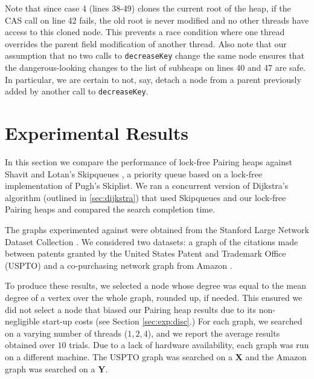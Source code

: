 \documentclass{acm_proc_article-sp}
\begin{document}
Note that since case 4 (lines 38-49) clones the current root of the heap, if the CAS
call on line 42 fails, the old root is never modified and no other threads
have access to this cloned node. This prevents a race condition where one
thread overrides the parent field modification of another thread. Also
note that our assumption that no two calls to \texttt{decreaseKey} change
the same node ensures that the dangerous-looking changes to the
list of subheaps on lines 40 and 47 are safe. In particular, we are
certain to not, say, detach a node from a parent previously added by
another call to \texttt{decreaseKey}.



\section{Experimental Results}
\label{sec:exp}
In this section we compare the performance of lock-free Pairing heaps against
Shavit and Lotan's Skipqueues \cite{shavit00}, a priority queue based
on a lock-free implementation of Pugh's \cite{pugh90a} Skiplist.
We ran a concurrent version of Dijkstra's algorithm (outlined in 
\ref{sec:dijkstra}) that used Skipqueues and our lock-free Pairing heaps
and compared the search completion time.

The graphs experimented against were obtained from 
the Stanford Large Network Dataset Collection \cite{slndc}.
We considered two datasets: a graph of the citations made
between patents granted by the United States Patent and Trademark
Office (USPTO) \cite{leskovec05}
and a co-purchasing network graph from Amazon \cite{leskovec07}.

To produce these results, we selected a node whose degree
was equal to the mean degree of a vertex over the whole graph,
rounded up, if needed. This ensured we did not select a node
that biased our Pairing heap results due to its non-negligible 
start-up costs (see Section \ref{sec:exp:disc}.) For each graph,
we searched on a varying number of threads ($1,2,4$), and
we report the average results obtained over $10$ trials. 
Due to a lack of hardware availability, each graph was run
on a different machine. The USPTO graph was searched on a \textbf{X}
and the Amazon graph was searched on a \textbf{Y}.
\end{document}
